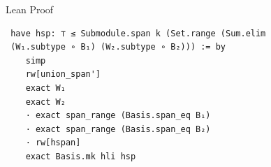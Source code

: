 \documentclass[svgnames]{beamer}
\begin{document}
\begin{frame}[label={sec_proof_comparison},fragile]{Lean Proof}

{\scriptsize
\begin{verbatim}
 have hsp: ⊤ ≤ Submodule.span k (Set.range (Sum.elim 
 (W₁.subtype ∘ B₁) (W₂.subtype ∘ B₂))) := by
    simp
    rw[union_span'] 
    exact W₁
    exact W₂
    · exact span_range (Basis.span_eq B₁)
    · exact span_range (Basis.span_eq B₂)
    · rw[hspan]
    exact Basis.mk hli hsp
\end{verbatim}
}

\end{frame}






\end{document}
